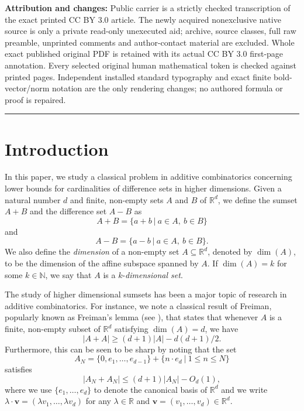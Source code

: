 \documentclass[10pt]{article}
\renewcommand\vec{\bm}
\numberwithin{equation}{section}
\begin{document}
\noindent\textbf{Attribution and changes:} Public carrier is a strictly checked transcription of the exact printed CC BY 3.0 article. The newly acquired nonexclusive native source is only a private read-only unexecuted aid; archive, source classes, full raw preamble, unprinted comments and author-contact material are excluded. Whole exact published original PDF is retained with its actual CC BY 3.0 first-page annotation. Every selected original human mathematical token is checked against printed pages. Independent installed standard typography and exact finite bold-vector/norm notation are the only rendering changes; no authored formula or proof is repaired.\par
\medskip\hrule\medskip
\section{Introduction}

In this paper, we study a classical problem in additive combinatorics concerning lower bounds for cardinalities of difference sets in higher dimensions. Given a natural number $d$ and finite, non-empty sets $A$ and $B$ of $\mathbb{R}^d$, we define the sumset $A+B$ and the difference set $A-B$ as
\[ A+ B = \{ a + b \ | \ a \in A, \ b \in B \}\]
and
\[A- B = \{ a- b \ | \ a \in A, \ b \in B\}. \]
We also define the \emph{dimension} of a non-empty set $A \subseteq \mathbb{R}^d$, denoted by $\dim(A)$, to be the dimension of the affine subspace spanned by $A$. If $\dim(A) = k$ for some $k \in \mathbb{N}$, we say that $A$ is a $k$-\emph{dimensional set}. 
\par

The study of higher dimensional sumsets has been a major topic of research in additive combinatorics. For instance, we note a classical result of Freiman, popularly known as Freiman's lemma (see \cite[Lemma $5.13$]{TV2006}), that states that whenever $A$ is a finite, non-empty subset of $\mathbb{R}^d$ satisfying $\dim(A) =d$, we have
\begin{equation} \label{i1frl}
 |A+A| \geq (d+1)|A| - d(d+1)/2. 
 \end{equation}
Furthermore, this can be seen to be sharp by noting that the set
\begin{equation} \label{trin1}
 A_N = \{0, e_1, \dots, e_{d-1}\} + \{n \cdot e_d \ | \ 1  \leq n \leq N\}
 \end{equation}
satisfies 
\[ |A_N + A_N| \leq (d+1)|A_N| - O_{d}(1), \]
where we use $\{e_1, \dots, e_d\}$ to denote the canonical basis of $\mathbb{R}^d$ and we write $\lambda \cdot \vec{v}= (\lambda v_1, \dots, \lambda v_d)$ for any $\lambda \in \mathbb{R}$ and $\vec{v} = (v_1, \dots, v_d) \in \mathbb{R}^d$. 
\par
\end{document}
